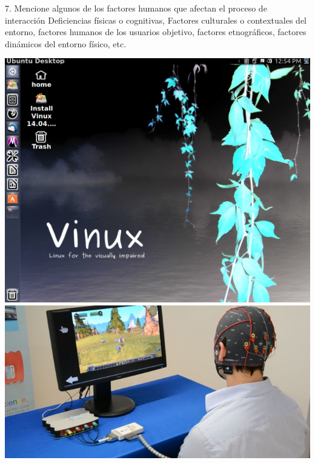 \documentclass{beamer}
\begin{document}
\begin{frame}
\begin{block}{7. Mencione algunos de los factores humanos que afectan el proceso de interacción}
Deficiencias físicas o cognitivas, Factores culturales o contextuales del entorno, factores
humanos de los usuarios objetivo, factores etnográficos, factores dinámicos del entorno
físico, etc.
\begin{center}
\includegraphics[scale = 0.1]{5.png}
\vspace{0.5}
\includegraphics[scale = 0.25]{5_1.jpg}
\end{center}
\end{block}
\end{frame}
\end{document}
